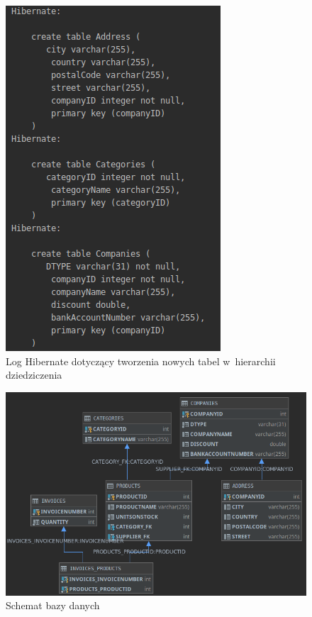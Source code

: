 \documentclass[12pt, a4paper]{mwart}
\begin{document}
\begin{figure}[ht]
  \centering
  \includegraphics[scale=0.5]{XI/11-1.png}
  \caption{Log Hibernate dotyczący tworzenia nowych tabel w~hierarchii dziedziczenia}
  \label{rys:11.1}
\end{figure}

\begin{figure}[ht]
  \centering
  \includegraphics[scale=0.40]{XI/11-2.png}
  \caption{Schemat bazy danych}
  \label{rys:11.2}
\end{figure}
\end{document}
